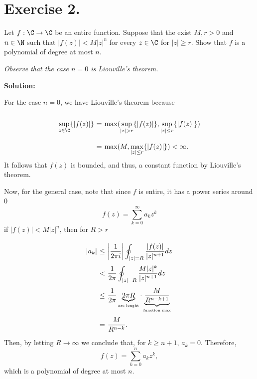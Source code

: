 \section*{Exercise 2.}

Let $f: \C \to \C$ be an entire function. Suppose that the exist $M, r> 0$ and $n\in \N$ such that $|f(z)|<M|z|^n$ for every $z\in\C$ for $|z|\geq r$. Show that $f$ is a polynomial of degree at most $n$.

\textit{Observe that the case $n = 0$ is Liouville's theorem.}

\textbf{Solution:}

For the case $n = 0$, we have Liouville's theorem because
\[ \everymath{\displaystyle}
\arraycolsep=1.8pt\def\arraystretch{2.5}
\begin{array}{rcl}
    \sup_{z\in\C}\{|f(z)|\} & = & \max(\sup_{|z| > r}\{|f(z)|\}, \sup_{|z| \leq r}\{|f(z)|\})\\
    & = & \max(M, \max_{|z| \leq r}\{|f(z)|\}) < \infty.
\end{array} \]
It follows that $f(z)$ is bounded, and thus, a constant function by Liouville's theorem. 

Now, for the general case, note that since $f$ is entire, it has a power series around 0
\[ f(z) = \sum_{k = 0}^{\infty} a_k z^k \]
if $|f(z)| < M |z|^n$, then for $R > r$
\[ \everymath{\displaystyle}
\arraycolsep=1.8pt\def\arraystretch{2.5}
\begin{array}{rcl}
    |a_k| & \leq & \left| \frac{1}{2\pi i} \right| \oint_{|z| = R} \frac{|f(z)|}{|z|^{n+1}} dz\\
    & < & \frac{1}{2\pi} \oint_{|z| = R} \frac{M|z|^k}{|z|^{n+1}} dz\\
    & \leq & \frac{1}{2\pi } \underbrace{2\pi R}_{\mbox{\tiny{arc lenght}}} \cdot \underbrace{\frac{M}{R^{n-k+1}}}_{\mbox{\tiny{function max}}}\\
    & = & \frac{M}{R^{n-k}}.
\end{array} \]
Then, by letting $R \to \infty$ we conclude that, for $k \geq n+1$, $a_k = 0$. Therefore,
\[ f(z) = \sum_{k = 0}^{n} a_k z^k, \]
which is a polynomial of degree at most $n$.
